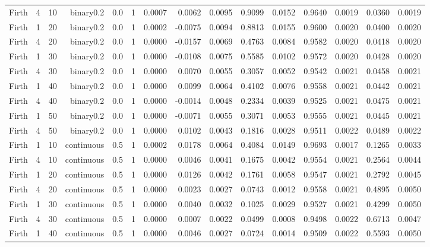 \begin{longtable}{rrrrrrrrrrrrrrr}
  Firth & 4 & 10 & binary0.2 & 0.0 & 1 & 0.0007 & 0.0062 & 0.0095 & 0.9099 & 0.0152 & 0.9640 & 0.0019 & 0.0360 & 0.0019 \\ 
  Firth & 1 & 20 & binary0.2 & 0.0 & 1 & 0.0002 & -0.0075 & 0.0094 & 0.8813 & 0.0155 & 0.9600 & 0.0020 & 0.0400 & 0.0020 \\ 
  Firth & 4 & 20 & binary0.2 & 0.0 & 1 & 0.0000 & -0.0157 & 0.0069 & 0.4763 & 0.0084 & 0.9582 & 0.0020 & 0.0418 & 0.0020 \\ 
  Firth & 1 & 30 & binary0.2 & 0.0 & 1 & 0.0000 & -0.0108 & 0.0075 & 0.5585 & 0.0102 & 0.9572 & 0.0020 & 0.0428 & 0.0020 \\ 
  Firth & 4 & 30 & binary0.2 & 0.0 & 1 & 0.0000 & 0.0070 & 0.0055 & 0.3057 & 0.0052 & 0.9542 & 0.0021 & 0.0458 & 0.0021 \\ 
  Firth & 1 & 40 & binary0.2 & 0.0 & 1 & 0.0000 & 0.0099 & 0.0064 & 0.4102 & 0.0076 & 0.9558 & 0.0021 & 0.0442 & 0.0021 \\ 
  Firth & 4 & 40 & binary0.2 & 0.0 & 1 & 0.0000 & -0.0014 & 0.0048 & 0.2334 & 0.0039 & 0.9525 & 0.0021 & 0.0475 & 0.0021 \\ 
  Firth & 1 & 50 & binary0.2 & 0.0 & 1 & 0.0000 & -0.0071 & 0.0055 & 0.3071 & 0.0053 & 0.9555 & 0.0021 & 0.0445 & 0.0021 \\ 
  Firth & 4 & 50 & binary0.2 & 0.0 & 1 & 0.0000 & 0.0102 & 0.0043 & 0.1816 & 0.0028 & 0.9511 & 0.0022 & 0.0489 & 0.0022 \\ 
  Firth & 1 & 10 & continuous & 0.5 & 1 & 0.0002 & 0.0178 & 0.0064 & 0.4084 & 0.0149 & 0.9693 & 0.0017 & 0.1265 & 0.0033 \\ 
  Firth & 4 & 10 & continuous & 0.5 & 1 & 0.0000 & 0.0046 & 0.0041 & 0.1675 & 0.0042 & 0.9554 & 0.0021 & 0.2564 & 0.0044 \\ 
  Firth & 1 & 20 & continuous & 0.5 & 1 & 0.0000 & 0.0126 & 0.0042 & 0.1761 & 0.0058 & 0.9547 & 0.0021 & 0.2792 & 0.0045 \\ 
  Firth & 4 & 20 & continuous & 0.5 & 1 & 0.0000 & 0.0023 & 0.0027 & 0.0743 & 0.0012 & 0.9558 & 0.0021 & 0.4895 & 0.0050 \\ 
  Firth & 1 & 30 & continuous & 0.5 & 1 & 0.0000 & 0.0040 & 0.0032 & 0.1025 & 0.0029 & 0.9527 & 0.0021 & 0.4299 & 0.0050 \\ 
  Firth & 4 & 30 & continuous & 0.5 & 1 & 0.0000 & 0.0007 & 0.0022 & 0.0499 & 0.0008 & 0.9498 & 0.0022 & 0.6713 & 0.0047 \\ 
  Firth & 1 & 40 & continuous & 0.5 & 1 & 0.0000 & 0.0046 & 0.0027 & 0.0724 & 0.0014 & 0.9509 & 0.0022 & 0.5593 & 0.0050 \\ 

\end{longtable}
